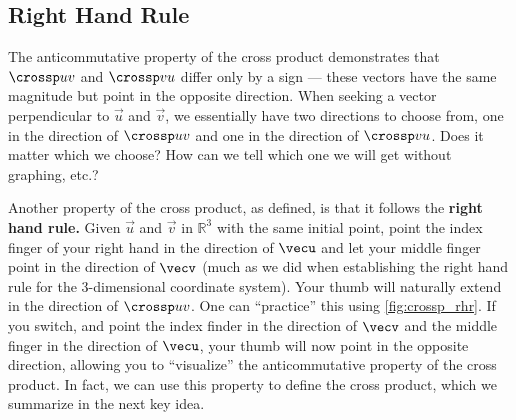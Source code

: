 \subsection*{Right Hand Rule}

The anticommutative property of the cross product demonstrates that $\crossp uv$ and $\crossp vu$ differ only by a sign --- these vectors have the same magnitude but point in the opposite direction. When seeking a vector perpendicular to $\vec u$ and $\vec v$, we essentially have two directions to choose from, one in the direction of $\crossp uv$ and one in the direction of $\crossp vu$. Does it matter which we choose? How can we tell which one we will get without graphing, etc.?


Another property of the cross product, as defined, is that it follows the \textbf{right hand rule.} Given $\vec u$ and $\vec v$ in $\mathbb{R}^3$ with the same initial point, point the index finger of your right hand in the direction of $\vecu$ and let your middle finger point in the direction of $\vecv$ (much as we did when establishing the right hand rule for the 3-dimensional coordinate system). Your thumb will naturally extend in the direction of $\crossp uv$. One can ``practice'' this using \autoref{fig:crossp_rhr}. If you switch, and point the index finder in the direction of $\vecv$ and the middle finger in the direction of $\vecu$, your thumb will now point in the opposite direction, allowing you to ``visualize'' the anticommutative property of the cross product.  In fact, we can use this property to define the cross product, which we summarize in the next key idea.


